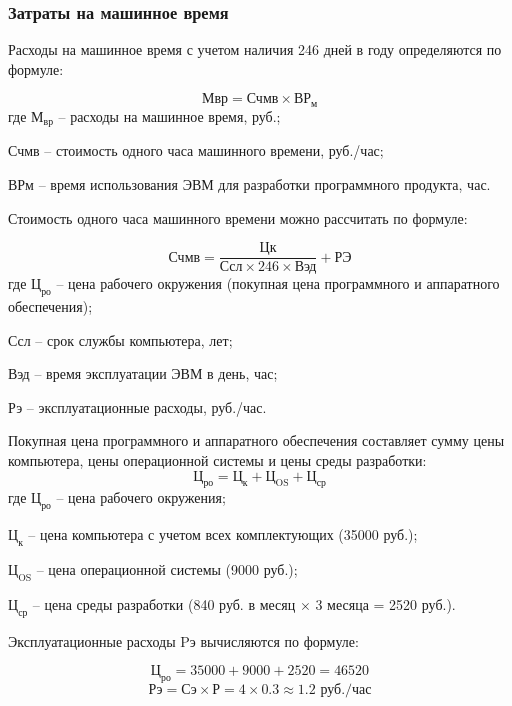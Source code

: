 \documentclass[a4paper]{extarticle}
\numberwithin{equation}{section}
\begin{document}
\subsubsection{Затраты на машинное время}
Расходы на машинное время с учетом наличия 246 дней в году определяются по формуле:\par
\begin{equation}
\label{form6}
	\text{Мвр}=\text{Счмв}\times \text{ВР}_\text{м}
\end{equation}
где $\text{М}_\text{вр}$ – расходы на машинное время, руб.;\par
Счмв – стоимость одного часа машинного времени, руб./час;\par
ВРм – время использования ЭВМ для разработки программного продукта, час.\par
Стоимость одного часа машинного времени можно рассчитать по формуле:\par
\begin{equation}
\label{form7}
	\text{Счмв}=\frac{\text{Цк}}{\text{Ссл}\times 246\times \text{Вэд}}+\text{РЭ}
\end{equation}
где $\text{Ц}_\text{ро}$ – цена рабочего окружения (покупная цена программного и аппаратного обеспечения);\par
Ссл – срок службы компьютера, лет;\par
Вэд – время эксплуатации ЭВМ в день, час;\par
Рэ – эксплуатационные расходы, руб./час.\par
Покупная цена программного и аппаратного обеспечения составляет сумму цены компьютера, цены операционной системы и цены среды разработки:
\begin{equation}
	\text{Ц}_\text{ро} = \text{Ц}_\text{к}+\text{Ц}_\text{OS}+\text{Ц}_\text{ср}
\end{equation}
где $\text{Ц}_\text{ро}$ – цена рабочего окружения;\par
$\text{Ц}_\text{к}$ – цена компьютера с учетом всех комплектующих (35000 руб.);\par
$\text{Ц}_\text{OS}$ – цена операционной системы (9000 руб.);\par
$\text{Ц}_\text{ср}$ – цена среды разработки (840 руб. в месяц $\times$ 3 месяца = 2520 руб.).\par
Эксплуатационные расходы Pэ вычисляются по формуле:\par
\begin{equation}
	\text{Ц}_\text{ро} = 35000+9000+2520=46520
\end{equation}
\begin{equation}
\label{form8}
	\text{Рэ}=\text{Сэ}\times \text{Р}=4\times 0.3\approx 1.2 \text{ руб./час}
\end{equation}
\end{document}
